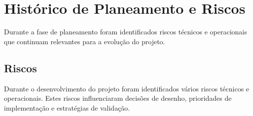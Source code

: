 \documentclass[11pt,a4paper]{report}
\begin{document}
    \appendix

    \chapter{Histórico de Planeamento e Riscos}
    Durante a fase de planeamento foram identificados riscos técnicos e operacionais que continuam relevantes para a evolução do projeto.

    \section{Riscos}

    Durante o desenvolvimento do projeto foram identificados vários riscos técnicos e operacionais. Estes riscos influenciaram decisões de desenho, prioridades de implementação e estratégias de validação.
\end{document}
